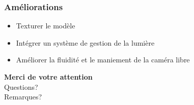 \documentclass[10pt]{beamer}
\begin{document}
\begin{frame}
\frametitle{Améliorations}
\begin{itemize}
	\item Texturer le modèle
	\item Intégrer un système de gestion de la lumière
	\item Améliorer la fluidité et le maniement de la caméra libre
\end{itemize}
\end{frame}

\begin{frame}
\begin{center}
\textbf{Merci de votre attention}\\
    Questions?\\
    Remarques?\\
\end{center}
\end{frame}
\end{document}
